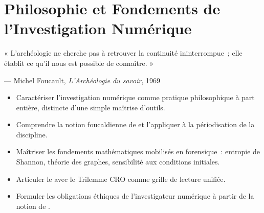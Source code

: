 %

\chapter{Philosophie et Fondements de l'Investigation Numérique}
\label{chap:phi-fond}

\epigraph{%
    « L'archéologie ne cherche pas à retrouver la continuité ininterrompue~;
    elle établit ce qu'il nous est possible de connaître. »%
}{--- Michel Foucault, \textit{L'Archéologie du savoir}, 1969}


\begin{boxobjectifs}
\begin{itemize}
    \item Caractériser l'investigation numérique comme pratique philosophique
          à part entière, distincte d'une simple maîtrise d'outils.
    \item Comprendre la notion foucaldienne de  et l'appliquer à la périodisation de la discipline.
    \item Maîtriser les fondements mathématiques mobilisés en forensique~:
          entropie de Shannon, théorie des graphes, sensibilité aux
          conditions initiales.
    \item Articuler le 
          avec le Trilemme CRO comme grille de lecture unifiée.
    \item Formuler les obligations éthiques de l'investigateur numérique
          à partir de la notion de .
\end{itemize}
\end{boxobjectifs}

